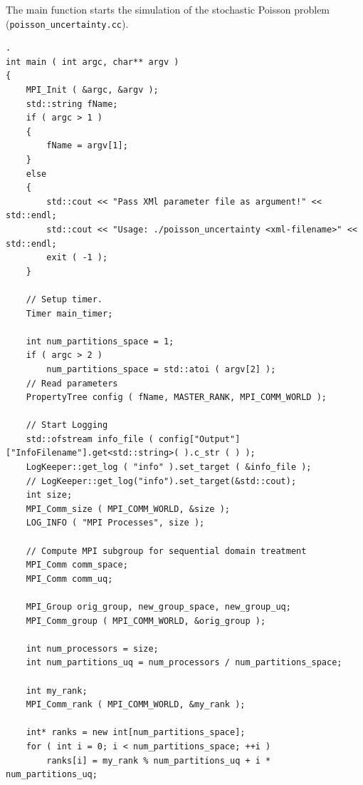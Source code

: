 \documentclass{article}
\begin{document}
The main function starts the simulation of the stochastic Poisson problem (\texttt{poisson\_uncertainty.cc}).

\begin{lstlisting}
.
int main ( int argc, char** argv )
{
    MPI_Init ( &argc, &argv );
    std::string fName;
    if ( argc > 1 )
    {
        fName = argv[1];
    }
    else
    {
        std::cout << "Pass XMl parameter file as argument!" << std::endl;
        std::cout << "Usage: ./poisson_uncertainty <xml-filename>" << std::endl;
        exit ( -1 );
    }

    // Setup timer.
    Timer main_timer;

    int num_partitions_space = 1;
    if ( argc > 2 )
        num_partitions_space = std::atoi ( argv[2] );
    // Read parameters
    PropertyTree config ( fName, MASTER_RANK, MPI_COMM_WORLD );

    // Start Logging
    std::ofstream info_file ( config["Output"]["InfoFilename"].get<std::string>( ).c_str ( ) );
    LogKeeper::get_log ( "info" ).set_target ( &info_file );
    // LogKeeper::get_log("info").set_target(&std::cout);
    int size;
    MPI_Comm_size ( MPI_COMM_WORLD, &size );
    LOG_INFO ( "MPI Processes", size );

    // Compute MPI subgroup for sequential domain treatment
    MPI_Comm comm_space;
    MPI_Comm comm_uq;

    MPI_Group orig_group, new_group_space, new_group_uq;
    MPI_Comm_group ( MPI_COMM_WORLD, &orig_group );

    int num_processors = size;
    int num_partitions_uq = num_processors / num_partitions_space;

    int my_rank;
    MPI_Comm_rank ( MPI_COMM_WORLD, &my_rank );

    int* ranks = new int[num_partitions_space];
    for ( int i = 0; i < num_partitions_space; ++i )
        ranks[i] = my_rank % num_partitions_uq + i * num_partitions_uq;


\end{lstlisting}
\end{document}

